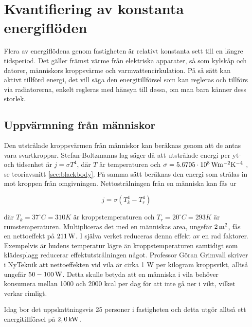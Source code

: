 \section{Kvantifiering av konstanta energiflöden}
\label{sec:constsources}


Flera av energiflödena genom fastigheten är relativt konstanta sett till en längre tidsperiod. Det gäller främst värme från elektriska apparater, så som kylskåp och datorer, människors kroppsvärme och varmvattencirkulation. På så sätt kan aktivt tillförd energi, det vill säga den energitillförsel som kan regleras och tillförs via radiatorerna, enkelt regleras med hänsyn till dessa, om man bara känner dess storlek.

\subsection{Uppvärmning från människor}
Den utstrålade kroppsvärmen från människor kan beräknas genom att de antas vara svartkroppar. Stefan-Boltzmanns lag säger då att utstrålade energi per yt- och tidsenhet är $j=\sigma T^4$, där $T$ är temperaturen och $\sigma=\unit[5.6705\cdot 10^8]{Wm^{-2}K^{-4}}$ \cite{physicshandbook}, se teoriavsnitt \ref{sec:blackbody}. På samma sätt beräknas den energi som strålas in mot kroppen från omgivningen. Nettostrålningen från en människa kan fås ur

\begin{equation}
\label{eq:constantsources:stefan}
j=\sigma \left( T_k^4 - T_r^4 \right)
\end{equation}
\noindent

där $T_k=37^{\circ}C=310K$ är kroppstemperaturen och $T_r=20^{\circ}C=293K$ är rumstemperaturen. Multipliceras det med en människas area, ungefär $\unit[2]{m^2}$, fås en nettoeffekt på $\unit[211]{W}$. I själva verket reduceras denna effekt av en rad faktorer. Exempelvis är hudens temperatur lägre än kroppstemperaturen samtidigt som klädesplagg reducerar effektutstrålningen något. Professor Göran Grimvall skriver i NyTeknik att nettoeffekten vid vila är cirka 1 W per kilogram kroppsvikt, alltså ungefär $\unit[50-100]{W}$\cite{Grimvall}. Detta skulle betyda att en människa i vila behöver konsumera mellan 1000 och 2000 kcal per dag för att inte gå ner i vikt, vilket verkar rimligt.

Idag bor det uppskattningsvis 25 personer i fastigheten och detta utgör alltså ett energitillförsel på $\unit[2,0]{kW}$.

